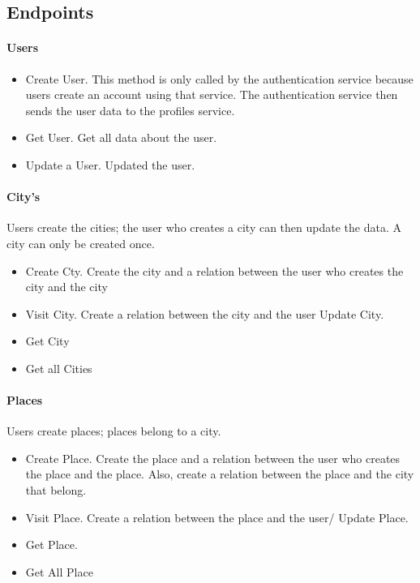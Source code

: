 \subsection{Endpoints}

\paragraph{Users}

\begin{itemize}
	\item Create User. This method is only called by the authentication service because users create an account using that service. The authentication service then sends the user data to the profiles service.
	
	\item	Get User. Get all data about the user.
	
	\item	Update a User. Updated the user.
\end{itemize}


\paragraph{City's}


\indent
Users create the cities; the user who creates a city can then update the data. A city can only be created once.



\begin{itemize}
	\item Create Cty.  Create the city and a relation between the user who creates the city and the city
	\item Visit City. Create a relation between the city and the user
	Update City. 
	\item Get City
	\item Get all Cities
\end{itemize}

\paragraph{Places}


\indent
Users create places; places belong to a city.

\begin{itemize}
	\item Create Place. Create the place and a relation between the user who creates the place and the place. Also, create a relation between the place and the city that belong.
	\item Visit Place. Create a relation between the place and the user/
	Update Place.
   \item	Get Place.
	\item Get All Place
\end{itemize}

